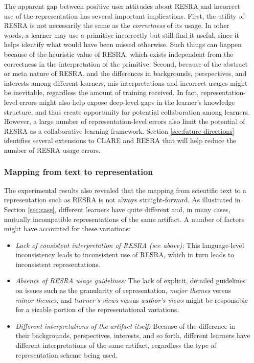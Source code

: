The apparent gap between positive user attitudes about RESRA and incorrect
use of the representation has several important implications. First, the
utility of RESRA is not necessarily the same as the {\it correctness\/} of
its usage. In other words, a learner may use a primitive incorrectly but
still find it useful, since it helps identify what would have been missed
otherwise.  Such things can happen because of the heuristic value of RESRA,
which exists independent from the correctness in the interpretation of the
primitive. Second, because of the abstract or meta nature of RESRA, and the
differences in backgrounds, perspectives, and interests among different
learners, mis-interpretations and incorrect usages might be inevitable,
regardless the amount of training received. In fact, representation-level
errors might also help expose deep-level gaps in the learner's knowledge
structure, and thus create opportunity for potential collaboration among
learners. However, a large number of representation-level errors also limit
the potential of RESRA as a collaborative learning framework.  Section
\ref{sec:future-directions} identifies several extensions to CLARE and
RESRA that will help reduce the number of RESRA usage errors.


\subsubsection{Mapping from text to representation}

The experimental results also revealed that the mapping from scientific
text to a representation such as RESRA is not always straight-forward. As
illustrated in Section \ref{sec:case}, different learners have quite
different and, in many cases, mutually incompatible representations of the
same artifact. A number of factors might have accounted for these
variations:

\begin{itemize}
\item {\it Lack of consistent interpretation of RESRA (see above):\/}
  This language-level inconsistency leads to inconsistent use of RESRA,
  which in turn leads to inconsistent representations.
  
\item {\it Absence of RESRA usage guidelines:} The lack of explicit,
  detailed guidelines on issues such as the granularity of
  representation, {\it major themes\/} versus {\it minor themes,\/} and
  {\it learner's views\/} versus {\it author's views\/} might be
  responsible for a sizable portion of the representational variations.
  
\item {\it Different interpretations of the artifact itself:\/} Because
  of the difference in their backgrounds, perspectives, interests, and so
  forth, different learners have different interpretations of the same
  artifact, regardless the type of representation scheme being used.
\end{itemize}

